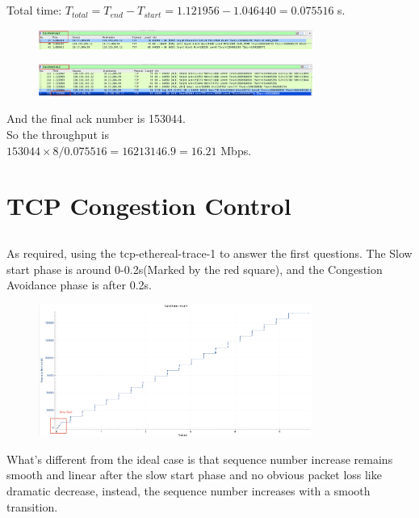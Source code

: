 \documentclass{article}
\begin{document}
\begin{CJK*}{UTF8}{gbsn}
\subsection{}
Total time: $T_{total} = T_{end} - T_{start} = 1.121956 - 1.046440 = 0.075516$ s.
\begin{figure}[H]
    \centering
    \includegraphics[width=0.8\textwidth]{12-1.png}
\end{figure}
\begin{figure}[H]
    \centering
    \includegraphics[width=0.8\textwidth]{12-2.png}
\end{figure}
And the final ack number is 153044. \\So
the throughput is \\$153044 \times 8 / 0.075516 = 16213146.9 = 16.21$ Mbps.

\section{TCP Congestion Control}

\subsection{}
As required, using the tcp-ethereal-trace-1 to answer the first questions.
The Slow start phase is around 0-0.2s(Marked by the red square), and the Congestion Avoidance phase is after 0.2s.
\begin{figure}[H]
    \centering
    \includegraphics[width=0.8\textwidth]{13-1.png}
\end{figure}
What's different from the ideal case is that
sequence number increase remains smooth and linear
after the slow start phase and no
obvious packet loss like dramatic decrease, instead,
the sequence number increases with a smooth transition.


\end{CJK*}
\end{document}
